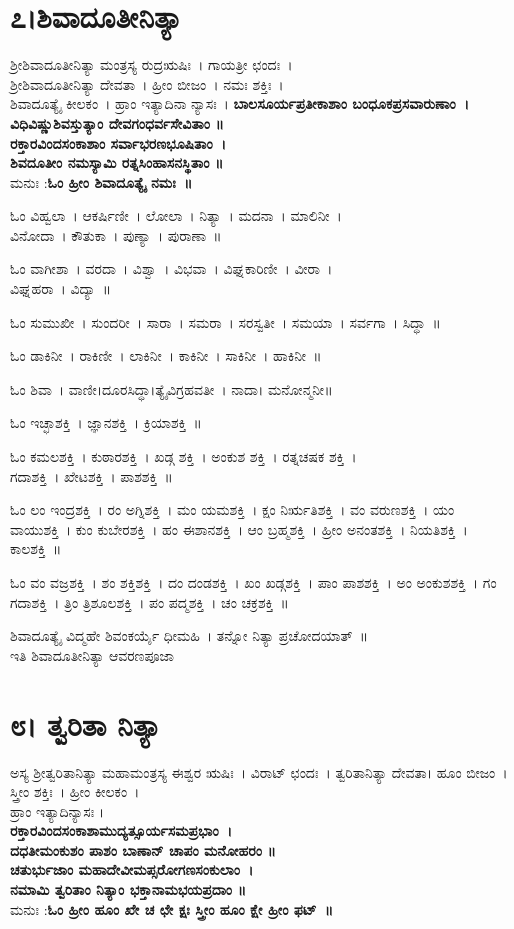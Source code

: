 \section{೭।ಶಿವಾದೂತೀನಿತ್ಯಾ}
ಶ್ರೀಶಿವಾದೂತೀನಿತ್ಯಾ ಮಂತ್ರಸ್ಯ ರುದ್ರಋಷಿಃ~। ಗಾಯತ್ರೀ ಛಂದಃ~।\\ ಶ್ರೀಶಿವಾದೂತೀನಿತ್ಯಾ ದೇವತಾ~। ಹ್ರೀಂ ಬೀಜಂ~। ನಮಃ ಶಕ್ತಿಃ~।\\ ಶಿವಾದೂತ್ಯೈ ಕೀಲಕಂ~। ಹ್ರಾಂ ಇತ್ಯಾದಿನಾ ನ್ಯಾಸಃ~।
{\bfseries ಬಾಲಸೂರ್ಯಪ್ರತೀಕಾಶಾಂ ಬಂಧೂಕಪ್ರಸವಾರುಣಾಂ~।\\
ವಿಧಿವಿಷ್ಣುಶಿವಸ್ತುತ್ಯಾಂ ದೇವಗಂಧರ್ವಸೇವಿತಾಂ ॥\\
ರಕ್ತಾರವಿಂದಸಂಕಾಶಾಂ ಸರ್ವಾಭರಣಭೂಷಿತಾಂ~।\\
ಶಿವದೂತೀಂ ನಮಸ್ಯಾಮಿ ರತ್ನಸಿಂಹಾಸನಸ್ಥಿತಾಂ ॥\\}
ಮನುಃ :{\bfseries  ಓಂ ಹ್ರೀಂ ಶಿವಾದೂತ್ಯೈ ನಮಃ~॥}

ಓಂ ವಿಹ್ವಲಾ~।  ಆಕರ್ಷಿಣೀ~।  ಲೋಲಾ~।  ನಿತ್ಯಾ~।  ಮದನಾ~।  ಮಾಲಿನೀ~। \\ವಿನೋದಾ~।  ಕೌತುಕಾ~।  ಪುಣ್ಯಾ~।  ಪುರಾಣಾ~॥ 

ಓಂ ವಾಗೀಶಾ~।  ವರದಾ~।  ವಿಶ್ವಾ~।  ವಿಭವಾ~।  ವಿಘ್ನಕಾರಿಣೀ~।  ವೀರಾ~। \\ವಿಘ್ನಹರಾ~।  ವಿದ್ಯಾ~॥ 

ಓಂ ಸುಮುಖೀ~।  ಸುಂದರೀ~।  ಸಾರಾ~।  ಸಮರಾ~।  ಸರಸ್ವತೀ~।  ಸಮಯಾ~।  ಸರ್ವಗಾ~।  ಸಿದ್ಧಾ~॥ 

ಓಂ ಡಾಕಿನೀ~।  ರಾಕಿಣೀ~।  ಲಾಕಿನೀ~।  ಕಾಕಿನೀ~।  ಸಾಕಿನೀ~।  ಹಾಕಿನೀ~॥ 

ಓಂ ಶಿವಾ~। ವಾಣೀ।ದೂರಸಿದ್ಧಾ।ತ್ಯೈವಿಗ್ರಹವತೀ~। ನಾದಾ।  ಮನೋನ್ಮನೀ॥ 

ಓಂ ಇಚ್ಛಾಶಕ್ತಿ~।  ಜ್ಞಾನಶಕ್ತಿ~।  ಕ್ರಿಯಾಶಕ್ತಿ~॥ 

ಓಂ ಕಮಲಶಕ್ತಿ~।  ಕುಠಾರಶಕ್ತಿ~।  ಖಡ್ಗ ಶಕ್ತಿ~।  ಅಂಕುಶ ಶಕ್ತಿ~।  ರತ್ನಚಷಕ ಶಕ್ತಿ~।\\ಗದಾಶಕ್ತಿ~।  ಖೇಟಶಕ್ತಿ~।  ಪಾಶಶಕ್ತಿ~॥ 

ಓಂ ಲಂ ಇಂದ್ರಶಕ್ತಿ~।  ರಂ ಅಗ್ನಿಶಕ್ತಿ~।  ಮಂ ಯಮಶಕ್ತಿ~।  ಕ್ಷಂ ನಿರ್ಋತಿಶಕ್ತಿ~।  ವಂ ವರುಣಶಕ್ತಿ~।  ಯಂ ವಾಯುಶಕ್ತಿ~।  ಕುಂ ಕುಬೇರಶಕ್ತಿ~।  ಹಂ ಈಶಾನಶಕ್ತಿ~।  ಆಂ ಬ್ರಹ್ಮಶಕ್ತಿ~।  ಹ್ರೀಂ ಅನಂತಶಕ್ತಿ~।  ನಿಯತಿಶಕ್ತಿ~।  ಕಾಲಶಕ್ತಿ~॥

ಓಂ ವಂ ವಜ್ರಶಕ್ತಿ~।  ಶಂ ಶಕ್ತಿಶಕ್ತಿ~।  ದಂ ದಂಡಶಕ್ತಿ~।  ಖಂ ಖಡ್ಗಶಕ್ತಿ~।  ಪಾಂ ಪಾಶಶಕ್ತಿ~।  ಅಂ ಅಂಕುಶಶಕ್ತಿ~।  ಗಂ ಗದಾಶಕ್ತಿ~।  ತ್ರಿಂ ತ್ರಿಶೂಲಶಕ್ತಿ~।  ಪಂ ಪದ್ಮಶಕ್ತಿ~।  ಚಂ ಚಕ್ರಶಕ್ತಿ~॥ 

ಶಿವಾದೂತ್ಯೈ ವಿದ್ಮಹೇ ಶಿವಂಕರ್ಯೈ ಧೀಮಹಿ~। ತನ್ನೋ ನಿತ್ಯಾ ಪ್ರಚೋದಯಾತ್~॥\\
ಇತಿ ಶಿವಾದೂತೀನಿತ್ಯಾ ಆವರಣಪೂಜಾ
\section{೮। ತ್ವರಿತಾ ನಿತ್ಯಾ}
ಅಸ್ಯ ಶ್ರೀತ್ವರಿತಾನಿತ್ಯಾ ಮಹಾಮಂತ್ರಸ್ಯ ಈಶ್ವರ ಋಷಿಃ~। ವಿರಾಟ್ ಛಂದಃ~। ತ್ವರಿತಾನಿತ್ಯಾ ದೇವತಾ। ಹೂಂ ಬೀಜಂ~। ಸ್ತ್ರೀಂ ಶಕ್ತಿಃ~। ಹ್ರೀಂ ಕೀಲಕಂ~।\\
ಹ್ರಾಂ ಇತ್ಯಾದಿನ್ಯಾಸಃ ।\\
{\bfseries ರಕ್ತಾರವಿಂದಸಂಕಾಶಾಮುದ್ಯತ್ಸೂರ್ಯಸಮಪ್ರಭಾಂ~।\\
ದಧತೀಮಂಕುಶಂ ಪಾಶಂ ಬಾಣಾನ್ ಚಾಪಂ ಮನೋಹರಂ ॥\\
ಚತುರ್ಭುಜಾಂ ಮಹಾದೇವೀಮಪ್ಸರೋಗಣಸಂಕುಲಾಂ~।\\
ನಮಾಮಿ ತ್ವರಿತಾಂ ನಿತ್ಯಾಂ ಭಕ್ತಾನಾಮಭಯಪ್ರದಾಂ ॥\\}
ಮನುಃ :{\bfseries  ಓಂ ಹ್ರೀಂ ಹೂಂ ಖೇ ಚ ಛೇ ಕ್ಷಃ ಸ್ತ್ರೀಂ ಹೂಂ ಕ್ಷೇ ಹ್ರೀಂ ಫಟ್~॥}

